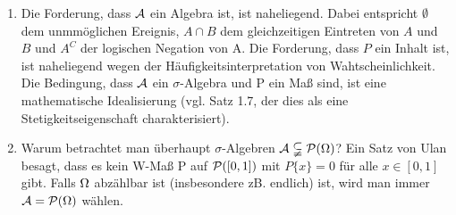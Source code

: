 \documentclass[parskip = full, 12pt]{scrartcl}
\begin{document}
\label{ss: Bemerkung 2.2}
	\begin{enumerate}
		\item Die Forderung, dass $\mathcal{A}$ ein Algebra ist, ist naheliegend. Dabei 
			entspricht $\emptyset$ dem unmmöglichen Ereignis, $A \cap B$ dem 
			gleichzeitigen Eintreten von $A$ und $B$ und $A^C$ der logischen Negation
			von A. Die Forderung, dass $P$ ein Inhalt ist, ist naheliegend wegen der 
			Häufigkeitsinterpretation von Wahtscheinlichkeit. Die Bedingung, dass $\mathcal{A}$
			ein $\sigma$-Algebra und P ein Maß sind, ist eine mathematische 
			Idealisierung (vgl. Satz 1.7, der dies als eine Stetigkeitseigenschaft 
			charakterisiert).
			\item Warum betrachtet man überhaupt $\sigma$-Algebren $\mathcal{A} \subsetneqq
			\mathcal{P}(\Omega)$? Ein Satz von Ulan besagt, dass es kein W-Maß P auf $\mathcal{P}([0,1]
			)$ mit $P\{x\} = 0$ für alle $x \in [0,1]$ gibt. Falls $\Omega$ abzählbar ist
			(insbesondere zB. endlich) ist, wird man immer $\mathcal{A} = \mathcal{P}(\Omega)$ wählen. 
	\end{enumerate}
\end{document}
